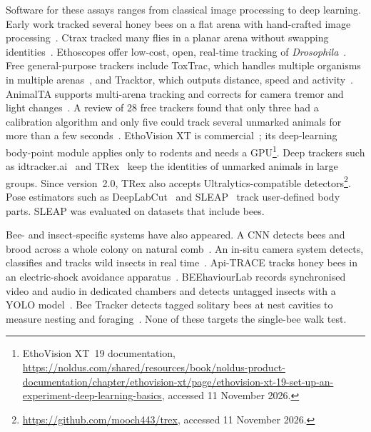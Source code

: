 \documentclass[pdflatex,sn-basic,Numbered]{sn-jnl}
\theoremstyle{thmstyleone}%
\begin{document}
Software for these assays ranges from classical image processing to deep learning. Early work tracked several honey bees on a flat arena with hand-crafted image processing~\cite{kimura2014development}. Ctrax tracked many flies in a planar arena without swapping identities~\cite{branson2009highthroughput}. Ethoscopes offer low-cost, open, real-time tracking of \textit{Drosophila}~\cite{geissmann2017ethoscopes}. Free general-purpose trackers include ToxTrac, which handles multiple organisms in multiple arenas~\cite{rodriguez2018toxtrac}, and Tracktor, which outputs distance, speed and activity~\cite{sridhar2019tracktor}. AnimalTA supports multi-arena tracking and corrects for camera tremor and light changes~\cite{chiara2023animalta}. A review of 28 free trackers found that only three had a calibration algorithm and only five could track several unmarked animals for more than a few seconds~\cite{panadeiro2021review}. EthoVision XT is commercial~\cite{lim2023comparison}; its deep-learning body-point module applies only to rodents and needs a GPU\footnote{EthoVision XT~19 documentation, \url{https://noldus.com/shared/resources/book/noldus-product-documentation/chapter/ethovision-xt/page/ethovision-xt-19-set-up-an-experiment-deep-learning-basics}, accessed 11 November 2026.}. Deep trackers such as idtracker.ai~\cite{romeroferrero2019idtrackerai} and TRex~\cite{walter2021trex} keep the identities of unmarked animals in large groups. Since version~2.0, TRex also accepts Ultralytics-compatible detectors\footnote{\url{https://github.com/mooch443/trex}, accessed 11 November 2026.}. Pose estimators such as DeepLabCut~\cite{mathis2018deeplabcut} and SLEAP~\cite{pereira2022sleap} track user-defined body parts. SLEAP was evaluated on datasets that include bees.

Bee- and insect-specific systems have also appeared. A CNN detects bees and brood across a whole colony on natural comb~\cite{bozek2021markerless}. An in-situ camera system detects, classifies and tracks wild insects in real time~\cite{bjerge2022realtime}. Api-TRACE tracks honey bees in an electric-shock avoidance apparatus~\cite{erdem2026apitrace}. BEEhaviourLab records synchronised video and audio in dedicated chambers and detects untagged insects with a YOLO model~\cite{parkinson2026acoustic}. Bee Tracker detects tagged solitary bees at nest cavities to measure nesting and foraging~\cite{knauer2022bee}. None of these targets the single-bee walk test.
\end{document}
